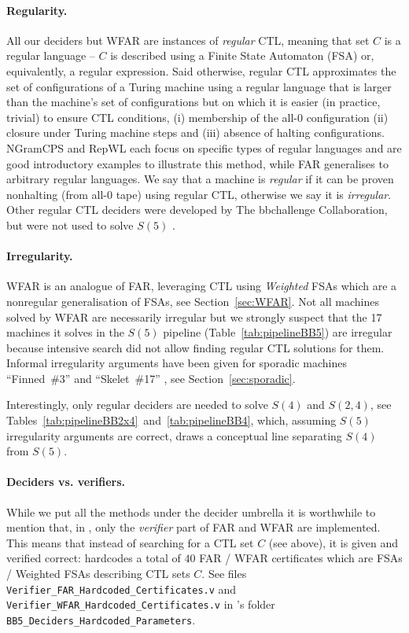 \paragraph{Regularity.} All our deciders but WFAR are instances of \textit{regular} CTL, meaning that set $C$ is a regular language -- \ie $C$ is described using a Finite State Automaton (FSA) or, equivalently, a regular expression. Said otherwise, regular CTL approximates the set of configurations of a Turing machine using a regular language that is larger than the machine's set of configurations but on which it is easier (in practice, trivial) to ensure CTL conditions, \ie (i) membership of the all-0 configuration (ii) closure under Turing machine steps and (iii) absence of halting configurations. NGramCPS and RepWL each focus on specific types of regular languages and are good introductory examples to illustrate this method, while FAR generalises to arbitrary regular languages. We say that a machine is \textit{regular} if it can be proven nonhalting (from all-0 tape) using regular CTL, otherwise we say it is \textit{irregular}. Other regular CTL deciders were developed by The bbchallenge Collaboration, but were not used to solve $S(5)$ \cite{BruteforceCTL, SymbolicTM, regexy, bbchallenge_part1}.

\vspace{-1ex}
\paragraph{Irregularity.} WFAR is an analogue of FAR, leveraging CTL using \textit{Weighted} FSAs which are a nonregular generalisation of FSAs, see Section~\ref{sec:WFAR}. Not all machines solved by WFAR are necessarily irregular but we strongly suspect that the 17 machines it solves in the $S(5)$ pipeline (Table~\ref{tab:pipelineBB5}) are irregular because intensive search did not allow finding regular CTL solutions for them. Informal irregularity arguments have been given for sporadic machines ``Finned~\#3'' and ``Skelet~\#17'' \cite{irregularFinned3, irregularSk17}, see Section~\ref{sec:sporadic}.

Interestingly, only regular deciders are needed to solve $S(4)$ and $S(2,4)$, see Tables~\ref{tab:pipelineBB2x4}~and~\ref{tab:pipelineBB4}, which, assuming $S(5)$ irregularity arguments are correct, draws a conceptual line separating $S(4)$ from $S(5)$.

\vspace{-1ex}
\paragraph{Deciders vs. verifiers.} While we put all the methods under the decider umbrella it is worthwhile to mention that, in \CoqBB, only the \textit{verifier} part of FAR and WFAR are implemented. This means that instead of searching for a CTL set $C$ (see above), it is given and verified correct: \CoqBB hardcodes a total of $40$ FAR /
WFAR certificates which are FSAs / Weighted FSAs describing CTL sets $C$. See files \texttt{Verifier\_FAR\_Hardcoded\_Certificates.v} and \texttt{Verifier\_WFAR\_Hardcoded\_Certificates.v} in \CoqBB's folder \texttt{BB5\_Deciders\_Hardcoded\_Parameters}.

